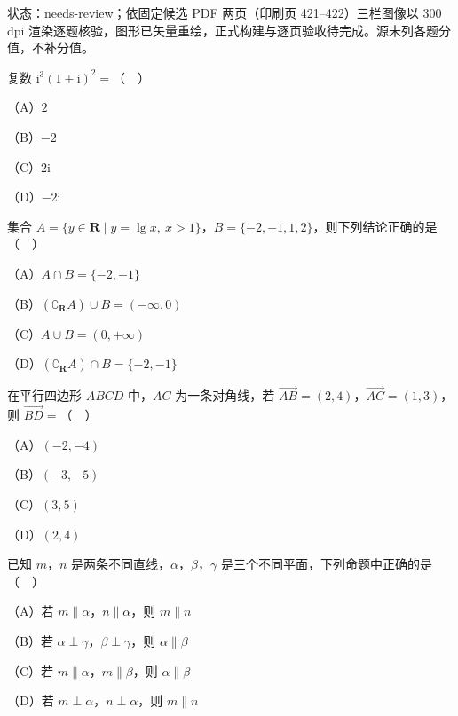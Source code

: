 

状态：needs-review；依固定候选 PDF 两页（印刷页 421–422）三栏图像以 300 dpi 渲染逐题核验，图形已矢量重绘，正式构建与逐页验收待完成。源未列各题分值，不补分值。


\begin{question}
复数 $\mathrm i^3(1+\mathrm i)^2=$（　）

（A）$2$

（B）$-2$

（C）$2\mathrm i$

（D）$-2\mathrm i$

\end{question}
\begin{question}
集合 $A=\{y\in\mathbf R\mid y=\lg x,\ x>1\}$，$B=\{-2,-1,1,2\}$，则下列结论正确的是（　）

（A）$A\cap B=\{-2,-1\}$

（B）$(\complement_{\mathbf R}A)\cup B=(-\infty,0)$

（C）$A\cup B=(0,+\infty)$

（D）$(\complement_{\mathbf R}A)\cap B=\{-2,-1\}$

\end{question}
\begin{question}
在平行四边形 $ABCD$ 中，$AC$ 为一条对角线，若 $\overrightarrow{AB}=(2,4)$，$\overrightarrow{AC}=(1,3)$，则 $\overrightarrow{BD}=$（　）

（A）$(-2,-4)$

（B）$(-3,-5)$

（C）$(3,5)$

（D）$(2,4)$

\end{question}
\begin{question}
已知 $m$，$n$ 是两条不同直线，$\alpha$，$\beta$，$\gamma$ 是三个不同平面，下列命题中正确的是（　）

（A）若 $m\parallel\alpha$，$n\parallel\alpha$，则 $m\parallel n$

（B）若 $\alpha\perp\gamma$，$\beta\perp\gamma$，则 $\alpha\parallel\beta$

（C）若 $m\parallel\alpha$，$m\parallel\beta$，则 $\alpha\parallel\beta$

（D）若 $m\perp\alpha$，$n\perp\alpha$，则 $m\parallel n$

\end{question}
